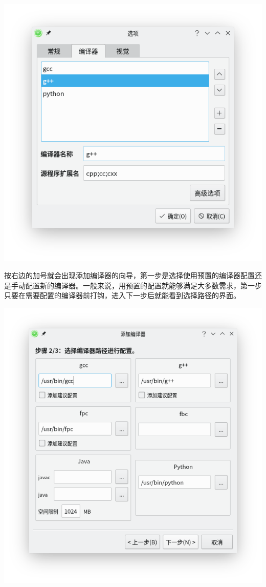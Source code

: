 \documentclass[UTF-8]{ctexart}
\begin{document}
				\begin{center}
					\includegraphics[scale=0.7]{pics/compilersettings.png}
				\end{center}

				按右边的加号就会出现添加编译器的向导，第一步是选择使用预置的编译器配置还是手动配置新的编译器。一般来说，用预置的配置就能够满足大多数需求，第一步只要在需要配置的编译器前打钩，进入下一步后就能看到选择路径的界面。

				\begin{center}
					\includegraphics[scale=0.7]{pics/addcompiler.png}
				\end{center}
\end{document}
